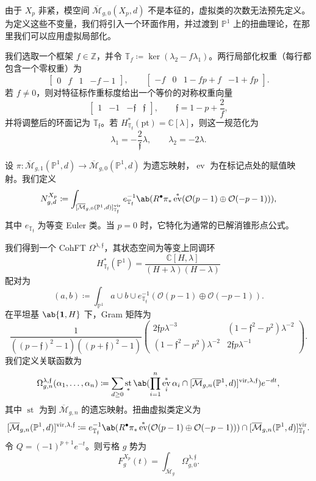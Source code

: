 \documentclass{amsart}
\theoremstyle{definition}
\theoremstyle{remark}
\theoremstyle{plain}
\theoremstyle{definition}
\theoremstyle{remark}
\newcommand{\C}{\mathbb{C}}
\newcommand{\Z}{\mathbb{Z}}
\renewcommand{\P}{\mathbb{P}}
\newcommand{\Mbar}{\overline{\mathcal{M}}}
\newcommand{\mc}[1]{\mathcal{#1}}
\newcommand{\T}{\mathbb{T}}
\newcommand{\mf}[1]{\mathfrak{#1}}
\newcommand{\mr}[1]{\mathrm{#1}}
\newcommand{\1}{\mathbf{1}}
\newcommand{\2}{\mathbf{2}}
\newcommand{\3}{\mathbf{3}}
\newcommand{\vir}{\mr{vir}}
\DeclareMathOperator{\ev}{ev}
\DeclareMathOperator{\st}{st}
\begin{document}
由于 \(X_p\) 非紧，模空间 \(\Mbar_{g,0}(X_p,d)\) 不是本征的，虚拟类的次数无法预先定义。为定义这些不变量，我们将引入一个环面作用，并过渡到 \(\P^1\) 上的扭曲理论，在那里我们可以应用虚拟局部化。

我们选取一个框架 \(f \in \Z\)，并令 \(\T_f \coloneqq \ker(\lambda_2 - f\lambda_1)\)。两行局部化权重（每行都包含一个零权重）为
\[ \begin{bmatrix} 0 & f & 1 & -f-1 \end{bmatrix}, \qquad \begin{bmatrix} -f & 0 & 1-fp+f & -1+fp \end{bmatrix}. \]
若 \(f \neq 0\)，则对特征标作重标度给出一个等价的对称权重向量
\[ \begin{bmatrix} 1 & -1 & -\mf{f} & \mf{f} \end{bmatrix}, \qquad \mf{f} = 1-p+\frac{2}{f}, \]
并将调整后的环面记为 \(\T_{\mf{f}}\)。若 \(H^*_{\T_{\mf{f}}}(\mr{pt}) = \C[\lambda]\)，则这一规范化为
\[ \lambda_1 = -\frac{2}{\mf{f}}\lambda, \qquad \lambda_2 = -2\lambda. \]

设 \(\pi \colon \Mbar_{g,1}(\P^1,d) \to \Mbar_{g,0}(\P^1,d)\) 为遗忘映射，\(\ev\) 为在标记点处的赋值映射。我们定义
\[ N^{X_p}_{g,d} \coloneqq \int_{[\Mbar_{g,0}(\P^1,d)]^{\vir}_{\T_{\mf{f}}}} e_{\T_{\mf{f}}}^{-1}\ab(R^{\bullet}\pi_* \ev^*(\mc{O}(p-1)\oplus\mc{O}(-p-1))), \]
其中 \(e_{\T_{\mf{f}}}\) 为等变 Euler 类。当 \(p=0\) 时，它特化为通常的已解消锥形点公式。

我们得到一个 CohFT \(\Omega^{\lambda,\mf{f}}\)，其状态空间为等变上同调环
\[ H^*_{\T_{\mf{f}}}(\P^1) = \frac{\C[H,\lambda]}{(H+\lambda)(H-\lambda)} \]
配对为
\[ (a,b) \coloneqq \int_{\P^1} a \cup b \cup e^{-1}_{\T_{\mf{f}}}(\mc{O}(p-1)\oplus\mc{O}(-p-1)). \]
在平坦基 \(\ab\{\1,H\}\) 下，Gram 矩阵为
\[ \frac{1}{((p-\mf{f})^2-1)((p+\mf{f})^2-1)}\begin{pmatrix} 2\mf{f}p\lambda^{-3} & (1-\mf{f}^2-p^2)\lambda^{-2} \\ (1-\mf{f}^2-p^2)\lambda^{-2} & 2\mf{f}p\lambda^{-1} \end{pmatrix}. \]
我们定义关联函数为
\[ \Omega^{\lambda,\mf{f}}_{g,n}(\alpha_1,\ldots,\alpha_n) \coloneqq \sum_{d\geq0}\st_*\ab(\prod_{i=1}^n \ev_i^*\alpha_i \cap [\Mbar_{g,n}(\P^1,d)]^{\vir,\lambda,\mf{f}})e^{-dt}, \]
其中 \(\st\) 为到 \(\Mbar_{g,n}\) 的遗忘映射。扭曲虚拟类定义为
\[ [\Mbar_{g,n}(\P^1,d)]^{\vir,\lambda,\mf{f}} \coloneqq e^{-1}_{\T_{\mf{f}}}\ab(R^{\bullet}\pi_*\ev^*(\mc{O}(p-1)\oplus\mc{O}(-p-1))) \cap [\Mbar_{g,n}(\P^1,d)]^{\vir}_{\T_{\mf{f}}}. \]
令 \(Q = (-1)^{p+1}e^{-t}\)。则亏格 \(g\) 势为
\[ F^{X_p}_g(t) = \int_{\Mbar_g} \Omega^{\lambda,\mf{f}}_{g,0}. \]
\end{document}
